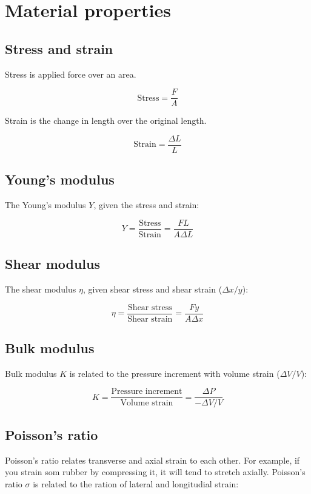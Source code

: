\documentclass[12pt]{article}
\begin{document}
\section{Material properties}

\subsection{Stress and strain}

Stress is applied force over an area.

\[
\boxed{
\text{Stress} = \frac{F}{A}
}
\]

Strain is the change in length over the original length.

\[
\boxed{
\text{Strain} = \frac{\Delta L}{L}
}
\]

\subsection{Young's modulus}

The Young's modulus $Y$, given the stress and strain:

\[
\boxed{
Y = \frac{\text{Stress}}{\text{Strain}} = \frac{FL}{A \Delta L}
}
\]

\subsection{Shear modulus}

The shear modulus $\eta$, given shear stress and shear strain ($\Delta x/y$):

\[
\boxed{
\eta = \frac{\text{Shear stress}}{\text{Shear strain}} = \frac{F y}{A \Delta x}
}
\]

\subsection{Bulk modulus}

Bulk modulus $K$ is related to the pressure increment with volume strain ($\Delta V/V$):

\[
\boxed{
K = \frac{\text{Pressure increment}}{\text{Volume strain}} = \frac{\Delta P}{- \Delta V/V}
}
\]

\subsection{Poisson's ratio}

Poisson's ratio relates transverse and axial strain to each other.
For example, if you strain som rubber by compressing it, it will tend to stretch axially.
Poisson's ratio $\sigma$ is related to the ration of lateral and longitudial strain:
\end{document}
